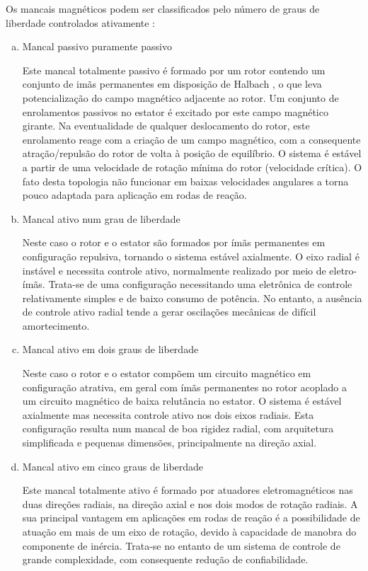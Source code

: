 Os mancais magnéticos podem ser classificados pelo número de graus de liberdade controlados ativamente \citep{Schweitzer2009}:

\begin{enumerate}[a)]
	\item  Mancal passivo puramente passivo
	
	Este mancal totalmente passivo é formado por um rotor contendo um conjunto de imãs permanentes em disposição de Halbach \citep{Detoni2012}, o que leva potencialização do campo magnético adjacente ao rotor. Um conjunto de enrolamentos passivos no estator é excitado por este campo magnético girante. Na eventualidade de qualquer deslocamento do rotor, este enrolamento reage com a criação de um campo magnético, com a consequente atração/repulsão do rotor de volta à posição de equilíbrio. O sistema é estável a partir de uma velocidade de rotação mínima do rotor (velocidade crítica). O fato desta topologia não funcionar em baixas velocidades angulares a torna pouco adaptada para aplicação em rodas de reação.
	
	\item  Mancal ativo num grau de liberdade
	
	Neste caso o rotor e o estator são formados por ímãs permanentes em configuração repulsiva, tornando o sistema estável axialmente. O eixo radial é instável e necessita controle ativo, normalmente realizado por meio de eletro-ímãs. Trata-se de uma configuração necessitando uma eletrônica de controle relativamente simples e de baixo consumo de potência. No entanto, a ausência de controle ativo radial tende a gerar oscilações mecânicas de difícil amortecimento.
	
	\item Mancal ativo em dois graus de liberdade
	
	Neste caso o rotor e o estator compõem um circuito magnético em configuração atrativa, em geral com ímãs permanentes no rotor acoplado a um circuito magnético de baixa relutância no estator. O sistema é estável axialmente mas necessita controle ativo nos dois eixos radiais. Esta configuração resulta num mancal de boa rigidez radial, com arquitetura simplificada e pequenas dimensões, principalmente na direção axial.
	
	\item Mancal ativo em cinco graus de liberdade
	
	Este mancal totalmente ativo é formado por atuadores eletromagnéticos nas duas direções radiais, na direção axial e nos dois modos de rotação radiais. A sua principal vantagem em aplicações em rodas de reação é a possibilidade de atuação em mais de um eixo de rotação, devido à capacidade de manobra do componente de inércia. Trata-se no entanto de um sistema de controle de grande complexidade, com consequente redução de confiabilidade. 
\end{enumerate}

